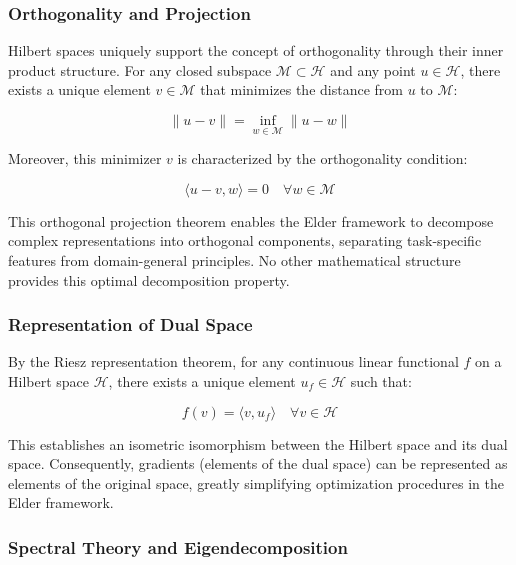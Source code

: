 \subsubsection{Orthogonality and Projection}

Hilbert spaces uniquely support the concept of orthogonality through their inner product structure. For any closed subspace $\mathcal{M} \subset \mathcal{H}$ and any point $u \in \mathcal{H}$, there exists a unique element $v \in \mathcal{M}$ that minimizes the distance from $u$ to $\mathcal{M}$:

\begin{equation}
\|u - v\| = \inf_{w \in \mathcal{M}} \|u - w\|
\end{equation}

Moreover, this minimizer $v$ is characterized by the orthogonality condition:

\begin{equation}
\langle u - v, w \rangle = 0 \quad \forall w \in \mathcal{M}
\end{equation}

This orthogonal projection theorem enables the Elder framework to decompose complex representations into orthogonal components, separating task-specific features from domain-general principles. No other mathematical structure provides this optimal decomposition property.

\subsubsection{Representation of Dual Space}

By the Riesz representation theorem, for any continuous linear functional $f$ on a Hilbert space $\mathcal{H}$, there exists a unique element $u_f \in \mathcal{H}$ such that:

\begin{equation}
f(v) = \langle v, u_f \rangle \quad \forall v \in \mathcal{H}
\end{equation}

This establishes an isometric isomorphism between the Hilbert space and its dual space. Consequently, gradients (elements of the dual space) can be represented as elements of the original space, greatly simplifying optimization procedures in the Elder framework.

\subsubsection{Spectral Theory and Eigendecomposition}

